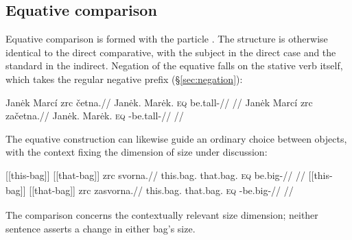 \subsection{Equative comparison}

Equative comparison is formed with the particle . The structure is
otherwise identical to the direct comparative, with the subject in the direct
case and the standard in the indirect. Negation of the equative falls on the
stative verb itself, which takes the regular negative prefix 
(§\ref{sec:negation}):

\pex
\a
\begingl
\gla Janėk Marcí zrc četna.//
\glb Janėk.\Dir{} Marėk.\Ind{} \textsc{eq} be.tall-\Cont{}//
\glft {}//
\endgl
\a
\begingl
\gla Janėk Marcí zrc začetna.//
\glb Janėk.\Dir{} Marėk.\Ind{} \textsc{eq} \Neg{}-be.tall-\Cont{}//
\glft {}//
\endgl
\xe

The equative construction can likewise guide an ordinary choice between
objects, with the context fixing the dimension of size under discussion:

\pex\label{ex:predicate-everyday-equative}
\a
\begingl
\gla \textnormal{[[this-bag]]}\textsubscript{\Dir{}} \textnormal{[[that-bag]]}\textsubscript{\Ind{}} zrc svorna.//
\glb this.bag.\Dir{} that.bag.\Ind{} \textsc{eq} be.big-\Cont{}//
\glft {}
//
\endgl
\a
\begingl
\gla \textnormal{[[this-bag]]}\textsubscript{\Dir{}} \textnormal{[[that-bag]]}\textsubscript{\Ind{}} zrc zasvorna.//
\glb this.bag.\Dir{} that.bag.\Ind{} \textsc{eq} \Neg{}-be.big-\Cont{}//
\glft {}
//
\endgl
\xe

The comparison concerns the contextually relevant size dimension; neither
sentence asserts a change in either bag's size.
